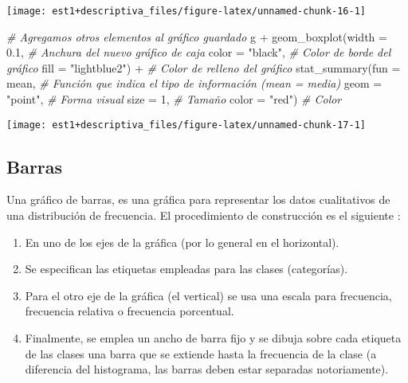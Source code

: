 \documentclass[
]{book}
\newenvironment{Shaded}{\begin{snugshade}}{\end{snugshade}}
\newcommand{\AttributeTok}[1]{\textcolor[rgb]{0.77,0.63,0.00}{#1}}
\newcommand{\CommentTok}[1]{\textcolor[rgb]{0.56,0.35,0.01}{\textit{#1}}}
\newcommand{\DecValTok}[1]{\textcolor[rgb]{0.00,0.00,0.81}{#1}}
\newcommand{\FloatTok}[1]{\textcolor[rgb]{0.00,0.00,0.81}{#1}}
\newcommand{\FunctionTok}[1]{\textcolor[rgb]{0.00,0.00,0.00}{#1}}
\newcommand{\NormalTok}[1]{#1}
\newcommand{\SpecialCharTok}[1]{\textcolor[rgb]{0.00,0.00,0.00}{#1}}
\newcommand{\StringTok}[1]{\textcolor[rgb]{0.31,0.60,0.02}{#1}}
\providecommand{\tightlist}{%
  \setlength{\itemsep}{0pt}\setlength{\parskip}{0pt}}
\begin{document}
\begin{center}\texttt{[image: est1+descriptiva\_files/figure-latex/unnamed-chunk-16-1]} \end{center}

\begin{Shaded}
\begin{Highlighting}[]
\CommentTok{\# Agregamos otros elementos al gráfico guardado}
\NormalTok{g }\SpecialCharTok{+} \FunctionTok{geom\_boxplot}\NormalTok{(}\AttributeTok{width =} \FloatTok{0.1}\NormalTok{, }\CommentTok{\# Anchura del nuevo gráfico de caja}
                 \AttributeTok{color =} \StringTok{"black"}\NormalTok{, }\CommentTok{\# Color de borde del gráfico}
                 \AttributeTok{fill =} \StringTok{"lightblue2"}\NormalTok{) }\SpecialCharTok{+} \CommentTok{\# Color de relleno del gráfico}
  \FunctionTok{stat\_summary}\NormalTok{(}\AttributeTok{fun =}\NormalTok{ mean, }\CommentTok{\# Función que indica el tipo de información (mean = media)}
               \AttributeTok{geom =} \StringTok{"point"}\NormalTok{, }\CommentTok{\# Forma visual}
               \AttributeTok{size =} \DecValTok{1}\NormalTok{, }\CommentTok{\# Tamaño}
               \AttributeTok{color =} \StringTok{"red"}\NormalTok{) }\CommentTok{\# Color}
\end{Highlighting}
\end{Shaded}

\begin{center}\texttt{[image: est1+descriptiva\_files/figure-latex/unnamed-chunk-17-1]} \end{center}

\hypertarget{barras}{%
\subsection{Barras}\label{barras}}

Una gráfico de barras, es una gráfica para representar los datos cualitativos de una distribución de frecuencia. El procedimiento de construcción es el siguiente \citep[página 29]{anderson}:

\begin{enumerate}
\def\labelenumi{\arabic{enumi}.}
\tightlist
\item
  En uno de los ejes de la gráfica (por lo general en el horizontal).
\item
  Se especifican las etiquetas empleadas para las clases (categorías).
\item
  Para el otro eje de la gráfica (el vertical) se usa una escala para frecuencia, frecuencia relativa o frecuencia porcentual.
\item
  Finalmente, se emplea un ancho de barra fijo y se dibuja sobre cada etiqueta de las clases una barra que se extiende hasta la frecuencia de la clase (a diferencia del histograma, las barras deben estar separadas notoriamente).
\end{enumerate}
\end{document}
